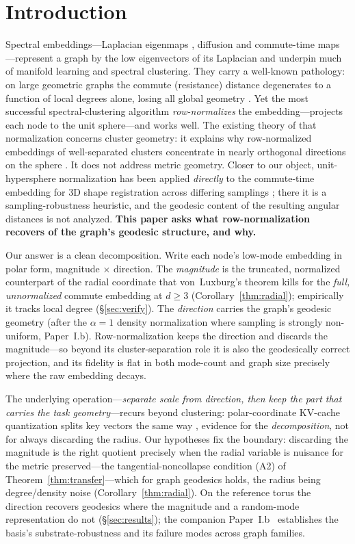 \documentclass[review]{siamart220329}
\begin{document}
\section{Introduction}
Spectral embeddings---Laplacian eigenmaps \cite{belkin2003}, diffusion and
commute-time maps \cite{coifman2006}---represent a graph by the low eigenvectors
of its Laplacian and underpin much of manifold learning and spectral clustering.
They carry a well-known pathology: on large geometric graphs the commute
(resistance) distance degenerates to a function of local degrees alone, losing
all global geometry \cite{vonluxburg2014}. Yet the most successful
spectral-clustering algorithm \cite{ng2002} \emph{row-normalizes} the
embedding---projects each node to the unit sphere---and works well. The
existing theory of that normalization concerns cluster geometry: it explains
why row-normalized embeddings of well-separated clusters concentrate in nearly
orthogonal directions on the sphere \cite{schiebinger2015,vonluxburg2008}. It
does not address metric geometry. Closer to our object, unit-hypersphere
normalization has been applied \emph{directly} to the commute-time embedding for
$3$D shape registration across differing samplings \cite{sharma2012}; there it is
a sampling-robustness heuristic, and the geodesic content of the resulting
angular distances is not analyzed. \textbf{This paper asks what row-normalization
recovers of the graph's geodesic structure, and why.}

Our answer is a clean decomposition. Write each node's low-mode embedding in polar
form, magnitude $\times$ direction. The \emph{magnitude} is the truncated,
normalized counterpart of the radial coordinate that von~Luxburg's theorem kills
for the \emph{full, unnormalized} commute embedding at $d\ge3$
(Corollary~\ref{thm:radial}); empirically it tracks local degree
(\S\ref{sec:verify}). The \emph{direction} carries
the graph's geodesic geometry (after the $\alpha{=}1$ density normalization
where sampling is strongly non-uniform, Paper~I.b). Row-normalization
keeps the direction and discards
the magnitude---so beyond its cluster-separation role it is also the
geodesically correct projection, and its fidelity is flat in both mode-count and
graph size precisely where the raw embedding decays.

The underlying operation---\emph{separate scale from direction, then keep the
part that carries the task geometry}---recurs beyond clustering: polar-coordinate
KV-cache quantization splits key vectors the same way \cite{polarquant2025},
evidence for the \emph{decomposition}, not for always discarding the radius. Our
hypotheses fix the boundary: discarding the magnitude is the right quotient
precisely when the radial variable is nuisance for the metric preserved---the
tangential-noncollapse condition (A2) of Theorem~\ref{thm:transfer}---which for
graph geodesics holds, the radius being degree/density noise
(Corollary~\ref{thm:radial}). On the reference torus the direction recovers
geodesics where the magnitude and a random-mode representation do not
(\S\ref{sec:results}); the companion Paper~I.b~\cite{paperIb} establishes the
basis's substrate-robustness and its failure modes across graph families.
\end{document}
